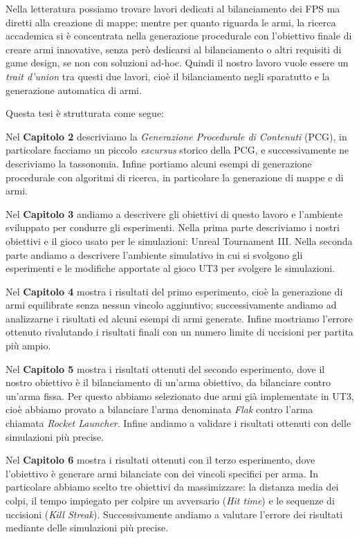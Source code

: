 \documentclass[12pt, italian]{toptesi}
\begin{document}
Nella letteratura possiamo trovare lavori dedicati al bilanciamento dei FPS ma diretti alla creazione di mappe; mentre per quanto riguarda le armi, la ricerca accademica si è concentrata nella generazione procedurale con l'obiettivo finale di creare armi innovative, senza però dedicarsi al bilanciamento o altri requisiti di game design, se non con soluzioni ad-hoc.
Quindi il nostro lavoro vuole essere un \emph{trait d'union} tra questi due lavori, cioè il bilanciamento negli sparatutto e la generazione automatica di armi.

Questa tesi è strutturata come segue: 

\bigskip

Nel \textbf{Capitolo 2} descriviamo la \emph{Generazione Procedurale di Contenuti} (PCG), in particolare facciamo un piccolo \emph{excursus} storico della PCG, e successivamente ne descriviamo la tassonomia. Infine portiamo alcuni esempi di generazione procedurale con algoritmi di ricerca, in particolare la generazione di mappe e di armi.

\bigskip

Nel \textbf{Capitolo 3} andiamo a descrivere gli obiettivi di questo lavoro e l'ambiente sviluppato per condurre gli esperimenti. Nella prima parte descriviamo i nostri obiettivi e il gioco usato per le simulazioni: Unreal Tournament III.
Nella seconda parte andiamo a descrivere l'ambiente simulativo in cui si svolgono gli esperimenti e le modifiche apportate al gioco UT3 per svolgere le simulazioni.

\bigskip

Nel \textbf{Capitolo 4} mostra i risultati del primo esperimento, cioè la generazione di armi equilibrate senza nessun vincolo aggiuntivo; successivamente andiamo ad analizzarne i risultati ed alcuni esempi di armi generate. Infine mostriamo l'errore ottenuto rivalutando i risultati finali con un numero limite di uccisioni per partita più ampio.

\bigskip

Nel \textbf{Capitolo 5} mostra i risultati ottenuti del secondo esperimento, dove il nostro obiettivo è il bilanciamento di un'arma obiettivo, da bilanciare contro un'arma fissa. Per questo abbiamo selezionato due armi già implementate in UT3, cioè abbiamo provato a bilanciare l'arma denominata \emph{Flak} contro l'arma chiamata \emph{Rocket Launcher}. Infine andiamo a validare i risultati ottenuti con delle simulazioni più precise.

\bigskip

Nel \textbf{Capitolo 6} mostra i risultati ottenuti con il terzo esperimento, dove l'obiettivo è generare armi bilanciate con dei vincoli specifici per arma.
In particolare abbiamo scelto tre obiettivi da massimizzare: la distanza media dei colpi, il tempo impiegato per colpire un avversario (\emph{Hit time}) e le sequenze di uccisioni (\emph{Kill Streak}).
Successivamente andiamo a valutare l'errore dei risultati mediante delle simulazioni più precise.
\end{document}
